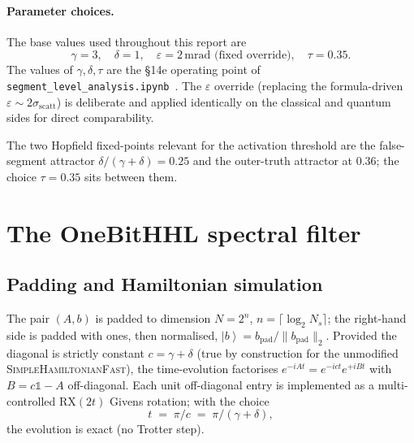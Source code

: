 \documentclass[11pt,a4paper]{article}
\providecommand{\ket}[1]{\left|#1\right\rangle}
\begin{document}
\paragraph{Parameter choices.}
The base values used throughout this report are
\begin{equation}
\gamma = 3, \quad \delta = 1, \quad \varepsilon = 2\,\mathrm{mrad} \text{ (fixed override)}, \quad
\tau = 0.35.
\end{equation}
The values of $\gamma, \delta, \tau$ are the §14e operating point of
\texttt{segment\_level\_analysis.ipynb}~\cite{Funke2025}. The $\varepsilon$ override
(replacing the formula-driven $\varepsilon \sim 2\sigma_{\mathrm{scatt}}$) is deliberate
and applied identically on the classical and quantum sides for direct comparability.

The two Hopfield fixed-points relevant for the activation threshold are the false-segment
attractor $\delta/(\gamma+\delta) = 0.25$ and the outer-truth attractor at $0.36$; the
choice $\tau = 0.35$ sits between them.

\section{The OneBitHHL spectral filter}
\label{sec:onebithhl}

\subsection{Padding and Hamiltonian simulation}
The pair $(A,b)$ is padded to dimension $N = 2^n$, $n = \lceil \log_2 N_s \rceil$; the
right-hand side is padded with ones, then normalised, $\ket{b} = b_\mathrm{pad}/\|b_\mathrm{pad}\|_2$.
Provided the diagonal is strictly constant $c = \gamma + \delta$ (true by construction
for the unmodified \textsc{SimpleHamiltonianFast}), the time-evolution factorises
$e^{-iAt} = e^{-ict} e^{+iBt}$ with $B = c\mathbb 1 - A$ off-diagonal. Each unit
off-diagonal entry is implemented as a multi-controlled $\mathrm{RX}(2t)$ Givens
rotation; with the choice
\begin{equation}
\label{eq:t}
t \;=\; \pi / c \;=\; \pi/(\gamma+\delta),
\end{equation}
the evolution is exact (no Trotter step).
\end{document}
